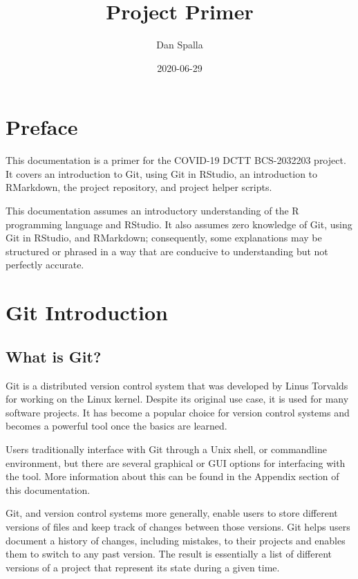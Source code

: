 \documentclass[
]{book}
\title{Project Primer}
\author{Dan Spalla}
\date{2020-06-29}
\begin{document}
\maketitle

{
\setcounter{tocdepth}{1}
\tableofcontents
}
\hypertarget{preface}{%
\chapter*{Preface}\label{preface}}

This documentation is a primer for the COVID-19 DCTT BCS-2032203 project. It covers an introduction to Git, using Git in RStudio, an introduction to RMarkdown, the project repository, and project helper scripts.

This documentation assumes an introductory understanding of the R programming language and RStudio. It also assumes zero knowledge of Git, using Git in RStudio, and RMarkdown; consequently, some explanations may be structured or phrased in a way that are conducive to understanding but not perfectly accurate.

\hypertarget{git-introduction}{%
\chapter{Git Introduction}\label{git-introduction}}

\hypertarget{what-is-git}{%
\section{What is Git?}\label{what-is-git}}

Git is a distributed version control system that was developed by Linus Torvalds for working on the Linux kernel. Despite its original use case, it is used for many software projects. It has become a popular choice for version control systems and becomes a powerful tool once the basics are learned.

Users traditionally interface with Git through a Unix shell, or commandline environment, but there are several graphical or GUI options for interfacing with the tool. More information about this can be found in the Appendix section of this documentation.

Git, and version control systems more generally, enable users to store different versions of files and keep track of changes between those versions. Git helps users document a history of changes, including mistakes, to their projects and enables them to switch to any past version. The result is essentially a list of different versions of a project that represent its state during a given time.
\end{document}
